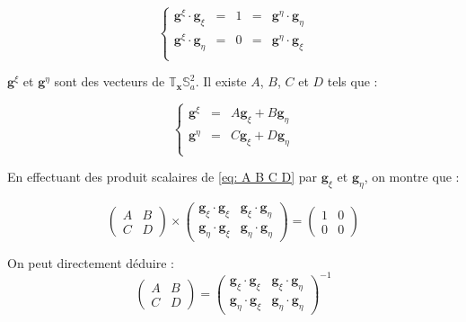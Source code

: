 \begin{equation}
\left\lbrace
\begin{array}{rcccl}
\mathbf{g}^{\xi} \cdot \mathbf{g}_{\xi} & = & 1 & = & \mathbf{g}^{\eta} \cdot \mathbf{g}_{\eta} \\
\mathbf{g}^{\xi} \cdot \mathbf{g}_{\eta} & = & 0 & = & \mathbf{g}^{\eta} \cdot \mathbf{g}_{\xi} \\
\end{array}
\right.
\label{eq: normalisation g_xi g_eta}
\end{equation}

$\mathbf{g}^{\xi}$ et $\mathbf{g}^{\eta}$ sont des vecteurs de $\mathbb{T}_{\mathbf{x}}\mathbb{S}_a^2$. Il existe $A$, $B$, $C$ et $D$ tels que :

\begin{equation}
\left\lbrace
\begin{array}{rcl}
\mathbf{g}^{\xi} & = & A \mathbf{g}_{\xi} + B \mathbf{g}_{\eta} \\
\mathbf{g}^{\eta} & = & C \mathbf{g}_{\xi} + D \mathbf{g}_{\eta} \\
\end{array}
\right.
\label{eq: A B C D}
\end{equation}

En effectuant des produit scalaires de \eqref{eq: A B C D} par $\mathbf{g}_{\xi}$ et $\mathbf{g}_{\eta}$, on montre que :

\begin{equation}
\begin{pmatrix}
A & B \\ C &  D
\end{pmatrix}
\times
\begin{pmatrix}
\mathbf{g}_{\xi} \cdot \mathbf{g}_{\xi} & \mathbf{g}_{\xi} \cdot \mathbf{g}_{\eta} \\
\mathbf{g}_{\eta} \cdot \mathbf{g}_{\xi} & \mathbf{g}_{\eta} \cdot \mathbf{g}_{\eta}
\end{pmatrix}
= \begin{pmatrix}
1 & 0 \\ 0 &  0
\end{pmatrix}
\end{equation}

On peut directement déduire :
\begin{equation}
\begin{pmatrix}
A & B \\ C &  D
\end{pmatrix} 
=
\begin{pmatrix}
\mathbf{g}_{\xi} \cdot \mathbf{g}_{\xi} & \mathbf{g}_{\xi} \cdot \mathbf{g}_{\eta} \\
\mathbf{g}_{\eta} \cdot \mathbf{g}_{\xi} & \mathbf{g}_{\eta} \cdot \mathbf{g}_{\eta}
\end{pmatrix}^{-1}
\end{equation}


